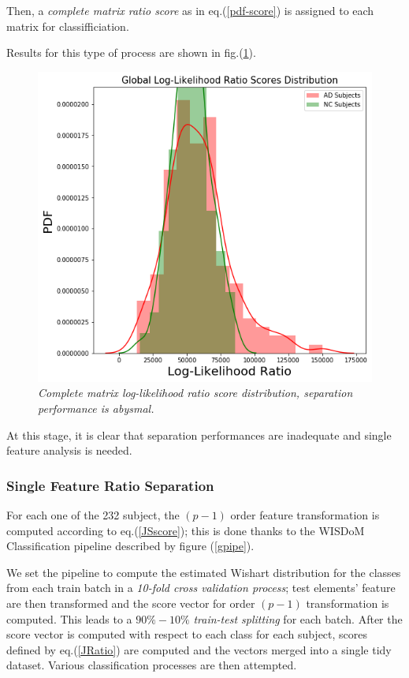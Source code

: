 \documentclass[12pt,openright,twoside,a4paper]{book}
\begin{document}
Then, a \textit{complete matrix ratio score} as in eq.(\ref{pdf-score}) is assigned to each matrix for classifficiation. 

Results for this type of process are shown in fig.(\ref{ADNI-Rglobal}).

\begin{figure}[!h]
\centering
\includegraphics[scale=0.5]{ADNI-Rglobal}
\caption{\textit{Complete matrix log-likelihood ratio score distribution, separation performance is abysmal.}}
\label{ADNI-Rglobal}
\end{figure}

At this stage, it is clear that separation performances are inadequate and single feature analysis is needed.

\subsubsection{Single Feature Ratio Separation}

For each one of the 232 subject, the $(p-1)$ order feature transformation is computed according to eq.(\ref{JSscore}); this is done thanks to the WISDoM Classification pipeline described by figure (\ref{gpipe}).

We set the pipeline to compute the estimated Wishart distribution for the classes from each train batch in a \textit{10-fold cross validation process}; test elements' feature are then transformed and the score vector for order $(p-1)$ transformation is computed.
This leads to a $90\%-10\%$  \textit{train-test splitting} for each batch.
After the score vector is computed with respect to each class for each subject, scores defined by eq.(\ref{JRatio}) are computed and the vectors merged into a single tidy dataset.
Various classification processes are then attempted.
\end{document}
